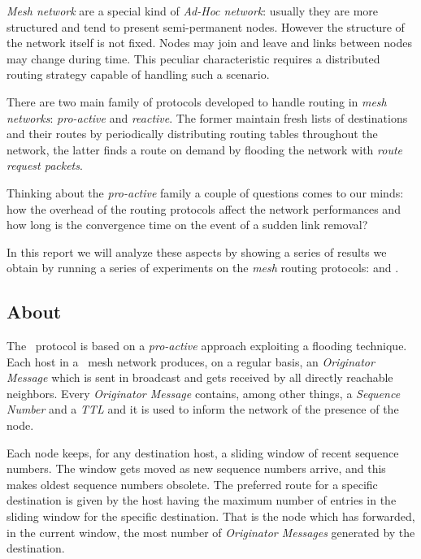 \emph{Mesh network} are a special kind of \emph{Ad-Hoc network}:
usually they are more structured and tend to present semi-permanent
nodes. However the structure of the network itself is not fixed. Nodes
may join and leave and links between nodes may change during
time. This peculiar characteristic requires a distributed routing
strategy capable of handling such a scenario.

There are two main family of protocols developed to handle routing in
\emph{mesh networks}: \emph{pro-active} and \emph{reactive}.
The former maintain fresh lists of destinations and their routes by
periodically distributing routing tables throughout the network, the
latter finds a route on demand by flooding the network with \emph{route
request packets}.

Thinking about the \emph{pro-active} family a couple of questions
comes to our minds: how the overhead of the routing protocols
affect the network performances and how long is the convergence time
on the event of a sudden link removal?

In this report we will analyze these aspects by showing a series of
results we obtain by running a series of experiments on the
\emph{mesh} routing protocols: \batman\cite{bib:BATMAN} and \olsr\cite{bib:OLSR}.

\subsection{About \batman}

    The \batman\ protocol is based on a \emph{pro-active} approach exploiting a
    flooding technique. Each host in a \batman\ mesh network produces, on a
    regular basis, an \emph{Originator Message} which is sent in
    broadcast and gets received by all directly reachable neighbors. Every
    \emph{Originator Message} contains, among other things, a
    \emph{Sequence Number} and a \emph{TTL} and it is used to
    inform the network of the presence of the node.

    Each node keeps, for any destination host, a sliding window of
    recent sequence numbers. The window gets moved as new sequence numbers
    arrive, and this makes oldest sequence numbers obsolete. The preferred
    route for a specific destination is given by the host having the
    maximum number of entries in the sliding window for the specific
    destination. That is the node which has forwarded, in the current
    window,  the most number of \emph{Originator Messages} generated
    by the destination.

